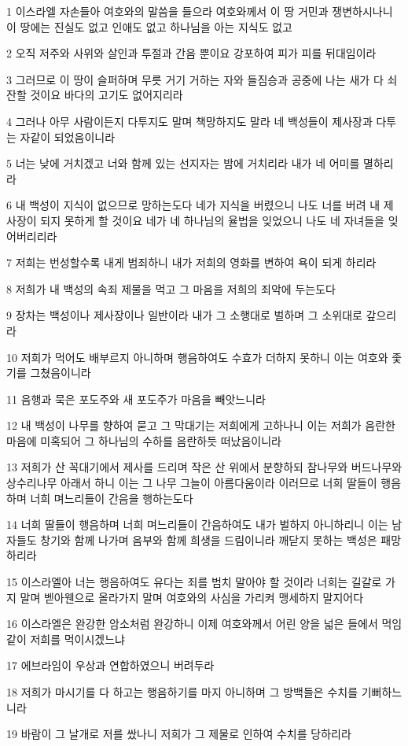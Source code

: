 \par 1 이스라엘 자손들아 여호와의 말씀을 들으라 여호와께서 이 땅 거민과 쟁변하시나니 이 땅에는 진실도 없고 인애도 없고 하나님을 아는 지식도 없고
\par 2 오직 저주와 사위와 살인과 투절과 간음 뿐이요 강포하여 피가 피를 뒤대임이라
\par 3 그러므로 이 땅이 슬퍼하며 무릇 거기 거하는 자와 들짐승과 공중에 나는 새가 다 쇠잔할 것이요 바다의 고기도 없어지리라
\par 4 그러나 아무 사람이든지 다투지도 말며 책망하지도 말라 네 백성들이 제사장과 다투는 자같이 되었음이니라
\par 5 너는 낮에 거치겠고 너와 함께 있는 선지자는 밤에 거치리라 내가 네 어미를 멸하리라
\par 6 내 백성이 지식이 없으므로 망하는도다 네가 지식을 버렸으니 나도 너를 버려 내 제사장이 되지 못하게 할 것이요 네가 네 하나님의 율법을 잊었으니 나도 네 자녀들을 잊어버리리라
\par 7 저희는 번성할수록 내게 범죄하니 내가 저희의 영화를 변하여 욕이 되게 하리라
\par 8 저희가 내 백성의 속죄 제물을 먹고 그 마음을 저희의 죄악에 두는도다
\par 9 장차는 백성이나 제사장이나 일반이라 내가 그 소행대로 벌하며 그 소위대로 갚으리라
\par 10 저희가 먹어도 배부르지 아니하며 행음하여도 수효가 더하지 못하니 이는 여호와 좇기를 그쳤음이니라
\par 11 음행과 묵은 포도주와 새 포도주가 마음을 빼앗느니라
\par 12 내 백성이 나무를 향하여 묻고 그 막대기는 저희에게 고하나니 이는 저희가 음란한 마음에 미혹되어 그 하나님의 수하를 음란하듯 떠났음이니라
\par 13 저희가 산 꼭대기에서 제사를 드리며 작은 산 위에서 분향하되 참나무와 버드나무와 상수리나무 아래서 하니 이는 그 나무 그늘이 아름다움이라 이러므로 너희 딸들이 행음하며 너희 며느리들이 간음을 행하는도다
\par 14 너희 딸들이 행음하며 너희 며느리들이 간음하여도 내가 벌하지 아니하리니 이는 남자들도 창기와 함께 나가며 음부와 함께 희생을 드림이니라 깨닫지 못하는 백성은 패망하리라
\par 15 이스라엘아 너는 행음하여도 유다는 죄를 범치 말아야 할 것이라 너희는 길갈로 가지 말며 벧아웬으로 올라가지 말며 여호와의 사심을 가리켜 맹세하지 말지어다
\par 16 이스라엘은 완강한 암소처럼 완강하니 이제 여호와께서 어린 양을 넓은 들에서 먹임같이 저희를 먹이시겠느냐
\par 17 에브라임이 우상과 연합하였으니 버려두라
\par 18 저희가 마시기를 다 하고는 행음하기를 마지 아니하며 그 방백들은 수치를 기뻐하느니라
\par 19 바람이 그 날개로 저를 쌌나니 저희가 그 제물로 인하여 수치를 당하리라

